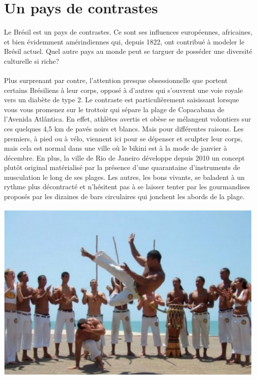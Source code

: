 \section{Un pays de contrastes}

\paragraph{} Le Brésil est un pays de contrastes. Ce sont ses influences
européennes, africaines, et bien évidemment amérindiennes qui, depuis 1822, ont
contribué à modeler le Brésil actuel. Quel autre pays au monde peut se targuer
de posséder une diversité culturelle si riche?

\paragraph{} Plus surprenant par contre, l’attention presque obsessionnelle que
portent certains Brésiliens à leur corps, opposé à d’autres qui s’ouvrent une
voie royale vers un diabète de type 2. Le contraste est particulièrement
saisissant lorsque vous vous promenez sur le trottoir qui sépare la plage de
Copacabana de l’Avenida Atlântica. En effet, athlètes avertis et obèse se
mélangent volontiers sur ces quelques 4,5 km de pavés noirs et blancs. Mais
pour différentes raisons. Les premiers, à pied ou à vélo, viennent ici pour se
dépenser et sculpter leur corps, mais cela est normal dans une ville où le
bikini est à la mode de janvier à décembre. En plus, la ville de Rio de Janeiro
développe depuis 2010 un concept plutôt original matérialisé par la présence
d’une quarantaine d’instruments de musculation le long de ses plages. Les
autres, les bons vivants, se baladent à un rythme plus décontracté et
n’hésitent pas à se laisser tenter par les gourmandises proposés par les
dizaines de bars circulaires qui jonchent les abords de la plage.

\begin{center}
\includegraphics[scale=0.5]{bresil2.png}
\end{center}

